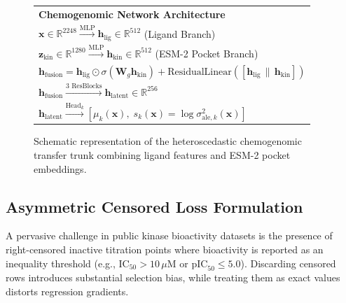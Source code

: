 \documentclass[journal]{IEEEtran}
\begin{document}
\begin{figure}[!t]
\centering
\small
\setlength{\tabcolsep}{8pt}
\begin{tabular}{|p{}|}
\hline
\vspace{0.2em}
\textbf{\large Chemogenomic Network Architecture}\\[0.4em]
$\mathbf{x} \in \mathbb{R}^{2248} \xrightarrow{\text{MLP}} \mathbf{h}_{\text{lig}} \in \mathbb{R}^{512}$ \quad (Ligand Branch)\\[0.2em]
$\mathbf{z}_{\text{kin}} \in \mathbb{R}^{1280} \xrightarrow{\text{MLP}} \mathbf{h}_{\text{kin}} \in \mathbb{R}^{512}$ \quad (ESM-2 Pocket Branch)\\[0.4em]
$\mathbf{h}_{\text{fusion}} = \mathbf{h}_{\text{lig}} \odot \sigma(\mathbf{W}_g \mathbf{h}_{\text{kin}}) + \text{ResidualLinear}([\mathbf{h}_{\text{lig}} \,\|\, \mathbf{h}_{\text{kin}}])$\\[0.4em]
$\mathbf{h}_{\text{fusion}} \xrightarrow{\text{3 ResBlocks}} \mathbf{h}_{\text{latent}} \in \mathbb{R}^{256}$\\[0.4em]
$\mathbf{h}_{\text{latent}} \xrightarrow{\text{Head}_k} \left[ \mu_k(\mathbf{x}), \; s_k(\mathbf{x}) = \log \sigma_{\text{ale}, k}^2(\mathbf{x}) \right]$\\[0.2em]
\hline
\end{tabular}
\caption{Schematic representation of the heteroscedastic chemogenomic transfer trunk combining ligand features and ESM-2 pocket embeddings.}
\label{fig:model_trunk}
\end{figure}

\subsection{Asymmetric Censored Loss Formulation}
A pervasive challenge in public kinase bioactivity datasets is the presence of right-censored inactive titration points where bioactivity is reported as an inequality threshold (e.g., $\text{IC}_{50} > 10\,\mu\text{M}$ or $\text{pIC}_{50} \le 5.0$). Discarding censored rows introduces substantial selection bias, while treating them as exact values distorts regression gradients.
\end{document}
